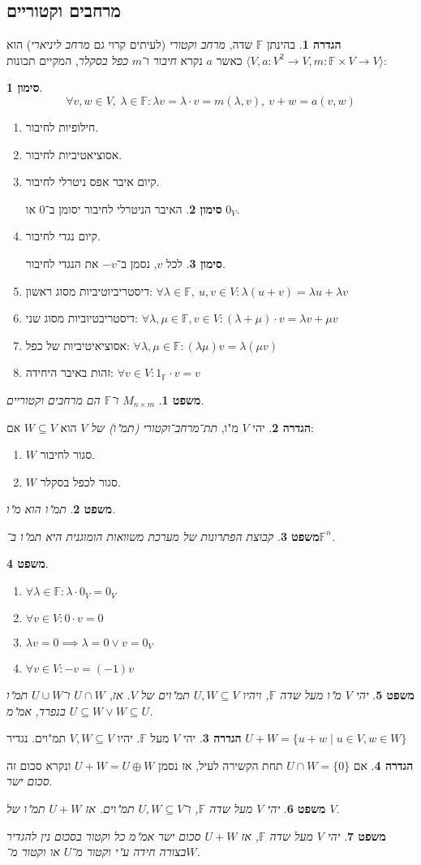 \documentclass[]{article}
\newcommand\ra    {\rangle}
\newcommand\la    {\langle}
\newcommand\F         {\mathbb{F}}
\newcommand\co        {\colon}
\renewcommand\lg      {\lambda}
\newtheorem{Theorem}{משפט}
\theoremstyle{definition}
\newtheorem{definition}{הגדרה}
\newtheorem{Notion}{סימון}
\newcommand\theo  [1] {\begin{Theorem}#1\end{Theorem}}
\newcommand\defi  [1] {\begin{definition}#1\end{definition}}
\newcommand\noti  [1] {\begin{Notion}#1\end{Notion}}
\begin{document}
\begin{multicols}{2}
		\section{מרחבים וקטוריים}
		\defi{בהינתן $\F$ שדה, \textit{מרחב וקטורי} (לעיתים קרוי גם \textit{מרחב ליניארי}) הוא $\la  V, a \co V^2 \to V, m \co \F \times V \to V\ra$ כאשר $a$ נקרא \textit{חיבור} ו־$m$ \textit{כפל בסקלר}, המקיים תכונות: 
			\noti{\[ \forall v, w \in V, \ \lg \in \F\co \lg v = \lg \cdot v = m(\lg, v), \ v + w = a(v, w) \]}
		\begin{enumerate}
			\item חילופיות לחיבור. 
			\item אסוציאטיביות לחיבור. 
			\item קיום איבר אפס ניטרלי לחיבור. 
			\noti{האיבר הניטרלי לחיבור יסומן ב־$0$ או $0_V$. }
			\item קיום נגדי לחיבור. 
			\noti{לכל $v$, נסמן ב־$-v$ את הנגדי לחיבור. }
			\item דיסטריביוטיביות מסוג ראשון: \hfill $\forall \lg \in \F, \ u, v \in V \co \lg(u + v) = \lg u + \lg v$
			\item דיסטריבטיוביות מסוג שני: \hfill $\forall \lg, \mu \in \F, v \in V \co (\lg + \mu) \cdot v = \lg v + \mu v$
			\item אסוציאיטיביות של כפל: \hfill $\forall \lg, \mu \in \F \co (\lg \mu) v = \lg (\mu v)$
			\item זהות באיבר היחידה: \hfill $\forall v \in V \co 1_\F \cdot v = v$
		\end{enumerate}
		}
		
		\theo{$M_{n \times m}$ ו־$\F$ הם מרחבים וקטוריים. }
		\defi{יהי $V$ מ"ו, \textit{תת־מרחב־וקטורי (תמ"ו) של $V$} הוא $W \subseteq V$ אם: 
		\begin{enumerate}
			\item $W$ סגור לחיבור. 
			\item $W$ סגור לכפל בסקלר. 
		\end{enumerate}}
		\theo{תמ"ו הוא מ"ו. }
		\theo{קבוצת הפתרונות של מערכת משוואות הומוגנית היא תמ"ו ב־$\F^n$. }
		\theo{\,
		\begin{enumerate}
			\item \hfil $ \forall \lg \in \F \co \lg \cdot 0_V = 0_V $
			\item \hfil $\forall v \in V \co 0 \cdot v = 0$
			\item \hfil $\lg v = 0 \implies \lg = 0 \lor v = 0_V$
			\item \hfil $\forall v \in V \co -v = (-1) v$
		\end{enumerate}}
		\theo{יהי $V$ מ"ו מעל שדה $\F$, ויהיו $U, W \subseteq V$ תמ"וים של $V$. אז, $U \cap W$ ו־$U \cup W$ תמ"ו בנפרד, אמ"מ $U \subseteq W \lor W \subseteq U$. }
		\defi{יהי $V$ מעל $\F$. יהיו $V, W \subseteq V$ תמ"וים. נגדיר $U + W = \{u + w \mid u \in V, w \in W\}$}
		\defi{אם $U \cap W  = \{0\}$ תחת הקשירה לעיל, אז נסמן $U + W = U \oplus W$ ונקרא סכום זה \textit{סכום ישר}. }
		\theo{יהי $V$ מעל שדה $\F$, ו־$U, W \subseteq V$ תמ"וים. אז $U + W$ תמ"ו של $V$. }
		\theo{יהי $V$ מעל שדה $\F$, אז $U + W$ סכום ישר אמ"מ כל וקטור בסכום נין להגדיר בצורה חידה ע"י וקטור מ־$U$ או וקטור מ־$W$. }
		

\end{multicols}
\end{document}
